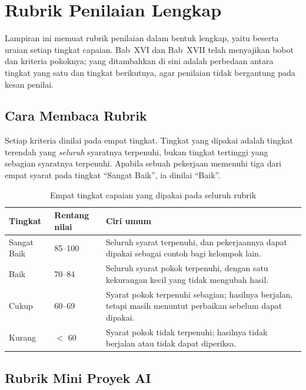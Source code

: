 \chapter{Rubrik Penilaian Lengkap}
\label{app:rubrik}

Lampiran ini memuat rubrik penilaian dalam bentuk lengkap, yaitu beserta
uraian setiap tingkat capaian. Bab~XVI dan Bab~XVII telah menyajikan bobot dan
kriteria pokoknya; yang ditambahkan di sini adalah perbedaan antara tingkat
yang satu dan tingkat berikutnya, agar penilaian tidak bergantung pada kesan
penilai.

\section{Cara Membaca Rubrik}

Setiap kriteria dinilai pada empat tingkat. Tingkat yang dipakai adalah
tingkat terendah yang \emph{seluruh} syaratnya terpenuhi, bukan tingkat
tertinggi yang sebagian syaratnya terpenuhi. Apabila sebuah pekerjaan memenuhi
tiga dari empat syarat pada tingkat ``Sangat Baik'', ia dinilai ``Baik''.

\begin{table}[htbp]
\centering
\caption{Empat tingkat capaian yang dipakai pada seluruh rubrik}
\label{tab:tingkat-capaian}
{\setlength{\tabcolsep}{4pt}\footnotesize%
\begin{tabularx}{\textwidth}{@{}L{3.4cm} C{2.2cm} Y@{}}
\toprule
\headrow \textbf{Tingkat} & \textbf{Rentang nilai} & \textbf{Ciri umum} \\
\midrule
Sangat Baik & 85--100 & Seluruh syarat terpenuhi, dan pekerjaannya dapat dipakai
sebagai contoh bagi kelompok lain. \\
\addlinespace
Baik & 70--84 & Seluruh syarat pokok terpenuhi, dengan satu kekurangan kecil
yang tidak mengubah hasil. \\
\addlinespace
Cukup & 60--69 & Syarat pokok terpenuhi sebagian; hasilnya berjalan, tetapi
masih menuntut perbaikan sebelum dapat dipakai. \\
\addlinespace
Kurang & $<$ 60 & Syarat pokok tidak terpenuhi; hasilnya tidak berjalan atau
tidak dapat diperiksa. \\
\bottomrule
\end{tabularx}}
\end{table}

\section{Rubrik Mini Proyek AI}

